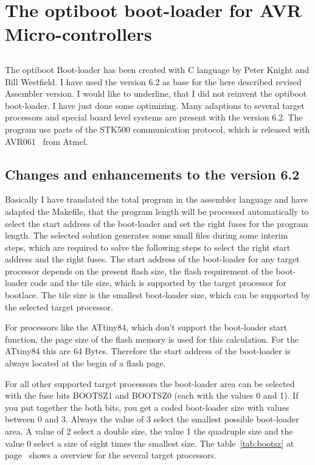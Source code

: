 \chapter{The optiboot boot-loader for AVR Micro-controllers}

\section*{}
The optiboot Boot-loader has been created with C language by Peter Knight and
Bill Westfield. I have used the version 6.2 as base
for the here described revised Assembler version.
I would like to underline, that I did not reinvent the
optiboot boot-loader. I have just done some optimizing.
Many adaptions to several target processors and special
board level systems are present with the version 6.2.
The program use parts of the STK500 communication protocol,
which is released with AVR061~\cite{stk500} from Atmel.


\section{Changes and enhancements to the version 6.2}
Basically I have translated the total program in the assembler language
and have adapted the Makefile, that the program length will
be processed automatically to select the start address of the boot-loader
and set the right fuses for the program length.
The selected solution generates some small files during some
interim steps, which are required to solve the following steps
to select the right start address and the right fuses.
The start address of the boot-loader for any target processor
depends on the present flash size, the flash requirement
of the boot-loader code and the tile size, which is supported
by the target processor for bootlace.
The tile size is the smallest boot-loader size, which can be supported
by the selected target processor.


For processors like the ATtiny84, which don't support the boot-loader start function,
the page size of the flash memory is used for this calculation.
For the ATtiny84 this are 64 Bytes. Therefore the start address of
the boot-loader is always located at the begin of a flash page.

For all other supported target processors the boot-loader area can be
selected with the fuse bits BOOTSZ1 and BOOTSZ0 (each with the values 0 and 1).
If you put together the both bits, you get a coded boot-loader size
with values between 0 and 3.
Always the value of 3 select the smallest possible boot-loader area.
A value of 2 select a double size, the value 1 the quadruple size
and the value 0 select a size of eight times the smallest size.
The table~\ref{tab:bootsz} at page~\pageref{tab:bootsz} shows a 
overview for the several target processors.

